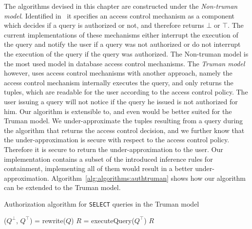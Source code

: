 The algorithms devised in this chapter are constructed under the \emph{Non-truman model}.
%
Identified in~\cite{rizvi2004extending} it specifies an access control mechanism as a component which decides if a query is authorized or not, and therefore returns $\bot$ or $\top$.
%
The current implementations of these mechanisms either interrupt the execution of the query and notify the user if a query was not authorized or do not interrupt the execution of the query if the query was authorized.
%
The Non-truman model is the most used model in database access control mechanisms.
%
The \emph{Truman model} however, uses access control mechanisms with another approach, namely the access control mechanism internally executes the query, and only returns the tuples, which are readable for the user according to the access control policy.
%
The user issuing a query will not notice if the query he issued is not authorized for him.
%
Our algorithm is extensible to, and even would be better suited for the Truman model.
%
We under-approximate the tuples resulting from a query during the algorithm that returns the access control decision, and we further know that the under-approximation is secure with respect to the access control policy.
%
Therefore it is secure to return the under-approximation to the user.
%
Our implementation contains a subset of the introduced inference rules for containment, implementing all of them would result in a better under-approximation.
%
Algorithm~\ref{alg:algorithms:authtruman} shows how our algorithm can be extended to the Truman model.
%
\begin{algorithm}
\caption{Authorization algorithm for \texttt{SELECT} queries in the Truman model}
\label{alg:algorithms:authtruman}
	\SetAlgoLined
	($Q^\bot$, $Q^\top$) = rewrite($Q$)\;
	$R$ = executeQuery($Q^\top$)\;
	\Return $R$
\end{algorithm}